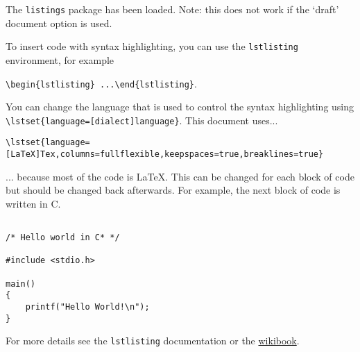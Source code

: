 The \texttt{listings} package has been loaded. Note: this does not work if the `draft' document option is used.

To insert code with syntax highlighting, you can use the \texttt{lstlisting} environment, for example

 \verb+\begin{lstlisting} ...\end{lstlisting}+.

You can change the language that is used to control the syntax highlighting using \verb+\lstset{language=[dialect]language}+. This document uses...

\begin{lstlisting}
\lstset{language=[LaTeX]Tex,columns=fullflexible,keepspaces=true,breaklines=true}
\end{lstlisting}

... because most of the code is LaTeX. This can be changed for each block of code but should be changed back afterwards. For example, the next block of code is written in C.

\lstset{language=c}
\begin{lstlisting}

/* Hello world in C* */

#include <stdio.h>

main()
{
    printf("Hello World!\n");
}
\end{lstlisting}

\lstset{language=[LaTeX]Tex}

For more details see the \texttt{lstlisting} documentation or the \href{https://en.wikibooks.org/wiki/LaTeX/Source_Code_Listings}{wikibook}.